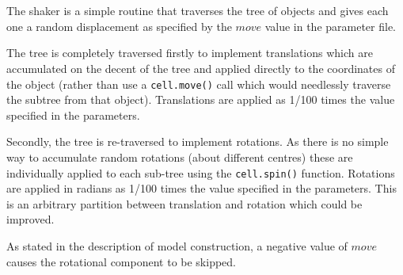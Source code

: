 \section{}

The shaker is a simple routine that traverses the tree of objects and gives
each one a random displacement as specified by the $move$ value in the parameter file.

The tree is completely traversed firstly to implement translations which are accumulated
on the decent of the tree and applied directly to the coordinates of the object (rather than
use a {\tt cell.move()} call which would needlessly traverse the subtree from that object). 
Translations are applied as 1/100 times the value specified in the parameters.

Secondly, the tree is re-traversed to implement rotations.  As there is no simple way
to accumulate random rotations (about different centres) these are individually applied
to each sub-tree using the {\tt cell.spin()} function.
Rotations are applied in radians as 1/100 times the value specified in the parameters.
This is an arbitrary partition between translation and rotation which could be improved.

As stated in the description of model construction, a negative value of $move$ causes the
rotational component to be skipped.

